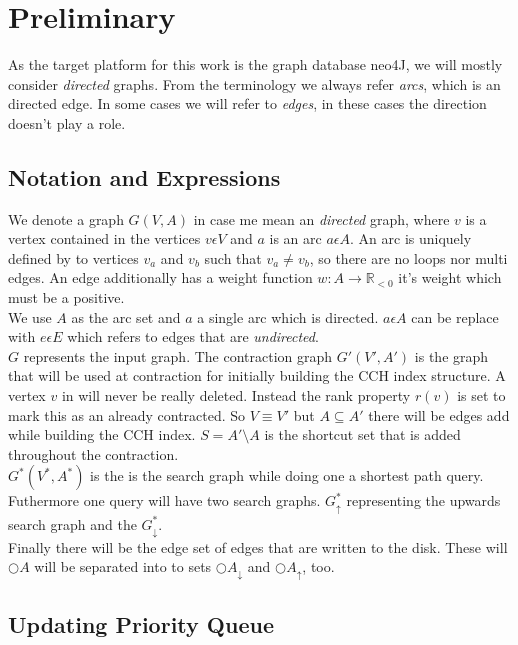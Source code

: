 \chapter{Preliminary}

As the target platform for this work is the graph database neo4J, we will mostly consider \textit{directed} graphs. From the terminology we always refer \textit{arcs}, which is an directed edge.
In some cases we will refer to \textit{edges}, in these cases the direction doesn't play a role.

\section{Notation and Expressions}
We denote a graph $G(V, A)$ in case me mean an \textit{directed} graph, where $v$ is a vertex contained in the vertices $v \epsilon  V$ and $a$ is an
arc $a \epsilon A$. An arc is uniquely defined by to vertices $v_a$ and $v_b$ such that $v_a \neq v_b$, so there are no loops nor multi edges.
An edge additionally has a weight function $w: A \rightarrow \mathbb{R}_{<0} $ it's weight which must be a positive.
\\
We use $A$ as the arc set and $a$ a single arc which is directed. $a \epsilon A$ can be replace with $e \epsilon E$ which refers to edges that are \textit{undirected}. 
\\
$G$ represents the input graph. The contraction graph $G'(V', A')$ is the graph that will be used at contraction for initially building the CCH index structure. A vertex $v$ in will 
never be really deleted. Instead the rank property $r(v)$ is set to mark this as an already contracted. So $V \equiv V'$ but $A \subseteq A'$ there will be edges add while building
the CCH index. $S = A' \setminus A$ is the shortcut set that is added throughout the contraction. 
\\
$G^*(V^*, A^*)$ is the is the search graph while doing one a shortest path query. Futhermore one query will have two search graphs. $G^*_\uparrow$ representing the upwards search graph
and the $G^*_\downarrow$.
\\
Finally there will be the edge set of edges that are written to the disk. These will $\bigcirc A$ will be separated into to sets $\bigcirc A_\downarrow$ and $\bigcirc A_\uparrow $, too. 

\section{Updating Priority Queue}

